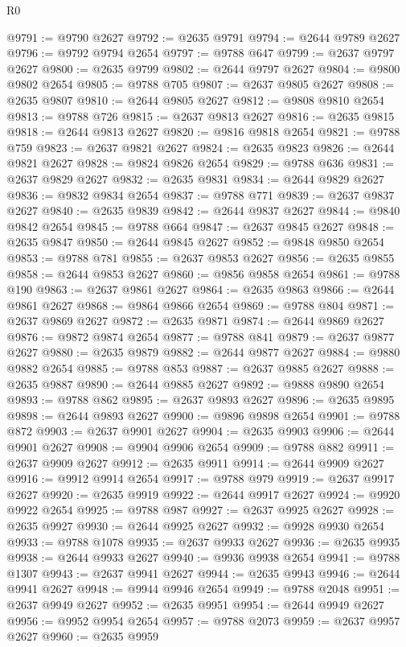 \begin{lexlean}{R0}
\begin{coremodule}
@9791 := @9790 @2627
@9792 := @2635 @9791
@9794 := @2644 @9789 @2627
@9796 := @9792 @9794 @2654
@9797 := @9788 @647
@9799 := @2637 @9797 @2627
@9800 := @2635 @9799
@9802 := @2644 @9797 @2627
@9804 := @9800 @9802 @2654
@9805 := @9788 @705
@9807 := @2637 @9805 @2627
@9808 := @2635 @9807
@9810 := @2644 @9805 @2627
@9812 := @9808 @9810 @2654
@9813 := @9788 @726
@9815 := @2637 @9813 @2627
@9816 := @2635 @9815
@9818 := @2644 @9813 @2627
@9820 := @9816 @9818 @2654
@9821 := @9788 @759
@9823 := @2637 @9821 @2627
@9824 := @2635 @9823
@9826 := @2644 @9821 @2627
@9828 := @9824 @9826 @2654
@9829 := @9788 @636
@9831 := @2637 @9829 @2627
@9832 := @2635 @9831
@9834 := @2644 @9829 @2627
@9836 := @9832 @9834 @2654
@9837 := @9788 @771
@9839 := @2637 @9837 @2627
@9840 := @2635 @9839
@9842 := @2644 @9837 @2627
@9844 := @9840 @9842 @2654
@9845 := @9788 @664
@9847 := @2637 @9845 @2627
@9848 := @2635 @9847
@9850 := @2644 @9845 @2627
@9852 := @9848 @9850 @2654
@9853 := @9788 @781
@9855 := @2637 @9853 @2627
@9856 := @2635 @9855
@9858 := @2644 @9853 @2627
@9860 := @9856 @9858 @2654
@9861 := @9788 @190
@9863 := @2637 @9861 @2627
@9864 := @2635 @9863
@9866 := @2644 @9861 @2627
@9868 := @9864 @9866 @2654
@9869 := @9788 @804
@9871 := @2637 @9869 @2627
@9872 := @2635 @9871
@9874 := @2644 @9869 @2627
@9876 := @9872 @9874 @2654
@9877 := @9788 @841
@9879 := @2637 @9877 @2627
@9880 := @2635 @9879
@9882 := @2644 @9877 @2627
@9884 := @9880 @9882 @2654
@9885 := @9788 @853
@9887 := @2637 @9885 @2627
@9888 := @2635 @9887
@9890 := @2644 @9885 @2627
@9892 := @9888 @9890 @2654
@9893 := @9788 @862
@9895 := @2637 @9893 @2627
@9896 := @2635 @9895
@9898 := @2644 @9893 @2627
@9900 := @9896 @9898 @2654
@9901 := @9788 @872
@9903 := @2637 @9901 @2627
@9904 := @2635 @9903
@9906 := @2644 @9901 @2627
@9908 := @9904 @9906 @2654
@9909 := @9788 @882
@9911 := @2637 @9909 @2627
@9912 := @2635 @9911
@9914 := @2644 @9909 @2627
@9916 := @9912 @9914 @2654
@9917 := @9788 @979
@9919 := @2637 @9917 @2627
@9920 := @2635 @9919
@9922 := @2644 @9917 @2627
@9924 := @9920 @9922 @2654
@9925 := @9788 @987
@9927 := @2637 @9925 @2627
@9928 := @2635 @9927
@9930 := @2644 @9925 @2627
@9932 := @9928 @9930 @2654
@9933 := @9788 @1078
@9935 := @2637 @9933 @2627
@9936 := @2635 @9935
@9938 := @2644 @9933 @2627
@9940 := @9936 @9938 @2654
@9941 := @9788 @1307
@9943 := @2637 @9941 @2627
@9944 := @2635 @9943
@9946 := @2644 @9941 @2627
@9948 := @9944 @9946 @2654
@9949 := @9788 @2048
@9951 := @2637 @9949 @2627
@9952 := @2635 @9951
@9954 := @2644 @9949 @2627
@9956 := @9952 @9954 @2654
@9957 := @9788 @2073
@9959 := @2637 @9957 @2627
@9960 := @2635 @9959

\end{coremodule}
\end{lexlean}
